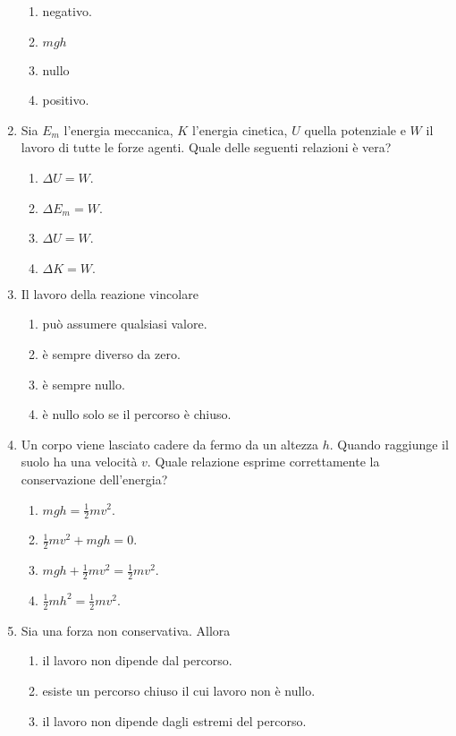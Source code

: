 \documentclass{article}
\begin{document}
\begin{enumerate}
  \begin{enumerate}[label=\Alph*.]
    \item negativo.
    \item $mgh$
    \item nullo
    \item positivo.
  \end{enumerate}
  \item Sia $E_m$ l'energia meccanica, $K$ l'energia cinetica, $U$ quella potenziale e $W$ il lavoro di tutte le forze agenti. Quale delle seguenti relazioni è vera?
  \begin{enumerate}[label=\Alph*.]
    \item $\Delta U=W$.
    \item $\Delta E_m=W$.
    \item $\Delta U=W$.
    \item $\Delta K=W.$
  \end{enumerate}
  \item Il lavoro della reazione vincolare
  \begin{enumerate}[label=\Alph*.]
    \item può assumere qualsiasi valore.
    \item è sempre diverso da zero.
    \item è sempre nullo.
    \item è nullo solo se il percorso è chiuso.
  \end{enumerate}
  \item Un corpo viene lasciato cadere da fermo da un altezza $h$. Quando raggiunge il suolo ha una velocità $v$. Quale relazione esprime correttamente la conservazione dell'energia?
  \begin{enumerate}[label=\Alph*.]
    \item $mgh=\frac{1}{2}mv^2$.
    \item $\frac{1}{2}mv^2+mgh=0.$
    \item $mgh+\frac{1}{2}mv^2=\frac{1}{2}mv^2.$
    \item $\frac{1}{2}mh^2=\frac{1}{2}mv^2$.
  \end{enumerate}
  \item Sia  una forza non conservativa. Allora
  \begin{enumerate}[label=\Alph*.]
    \item il lavoro non dipende dal percorso.
    \item esiste un percorso chiuso il cui lavoro non è nullo.
    \item il lavoro non dipende dagli estremi del percorso.

\end{enumerate}
\end{enumerate}
\end{document}
